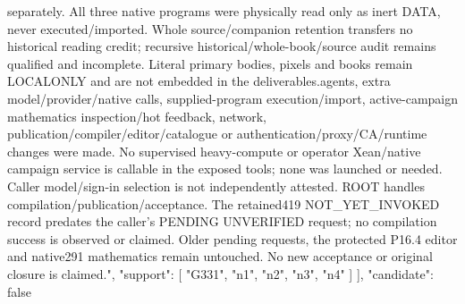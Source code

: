 \documentclass[11pt]{article}
\begin{document}
\begin{Full422Data}
{{separately. All three native programs were physically read only as inert DATA, never executed/imported. Whole source/companion retention transfers no historical reading credit; recursive historical/whole-book/source audit remains qualified and incomplete. Literal primary bodies, pixels and books remain LOCALONLY and are not embedded in the deliverables.\n\nNo agents, extra model/provider/native calls, supplied-program execution/import, active-campaign mathematics inspection/hot feedback, network, publication/compiler/editor/catalogue or authentication/proxy/CA/runtime changes were made. No supervised heavy-compute or operator Xean/native campaign service is callable in the exposed tools; none was launched or needed. Caller model/sign-in selection is not independently attested. ROOT handles compilation/publication/acceptance. The retained419 NOT_YET_INVOKED record predates the caller's PENDING UNVERIFIED request; no compilation success is observed or claimed. Older pending requests, the protected P16.4 editor and native291 mathematics remain untouched. No new acceptance or original closure is claimed.",
      "support": [
        "G331",
        "n1",
        "n2",
        "n3",
        "n4"
      ]
    }
  ],
  "candidate": false
}

\end{Full422Data}
\end{document}
